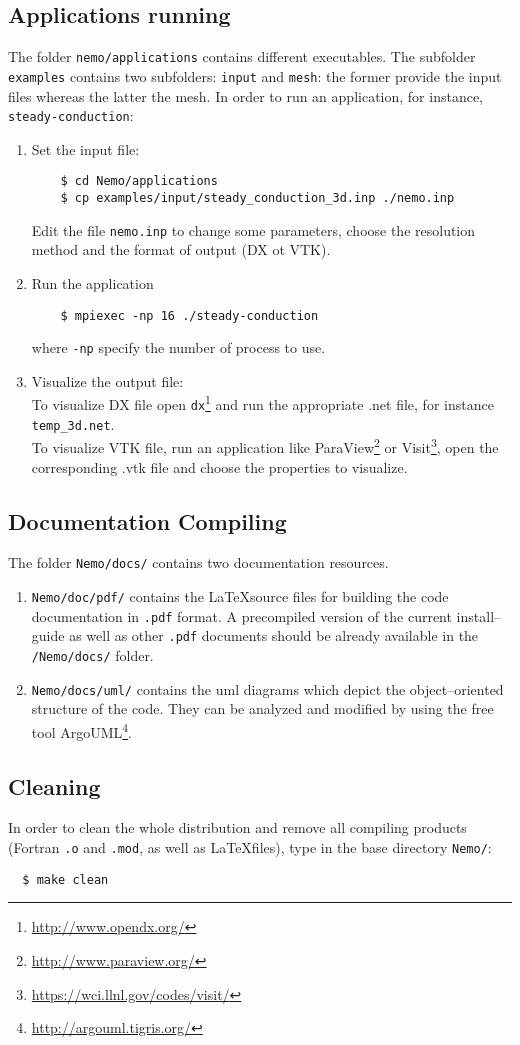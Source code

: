 \documentclass[a4paper,12pt]{article}%
\begin{document}
\subsection{Applications running}
The folder \verb+nemo/applications+ contains different executables. 
The subfolder \verb+examples+ contains two subfolders: \verb+input+ and 
\verb+mesh+: the former provide the input files whereas the latter the mesh.
In order to run an application, for instance, \verb+steady-conduction+:
\begin{enumerate}
\item Set the input file:
\begin{Verbatim}
    $ cd Nemo/applications
    $ cp examples/input/steady_conduction_3d.inp ./nemo.inp
\end{Verbatim}
Edit the file \verb+nemo.inp+ to change some parameters, choose the resolution method and the format of output (DX ot VTK).
\item Run the application
\begin{Verbatim}
    $ mpiexec -np 16 ./steady-conduction
\end{Verbatim}
where \verb+-np+ specify the number of process to use.
\item Visualize the output file:\\
To visualize DX file open \verb+dx+\footnote{\url{http://www.opendx.org/}} and run the appropriate .net file, for instance \verb+temp_3d.net+. \\
To visualize VTK file, run an application like ParaView\footnote{\url{http://www.paraview.org/}} or Visit\footnote{\url{https://wci.llnl.gov/codes/visit/}}, open the corresponding .vtk  file and choose the properties to visualize.
\end{enumerate}

\subsection{Documentation Compiling}

The folder \verb+Nemo/docs/+ contains two documentation resources.
\begin{enumerate}
\item \verb+Nemo/doc/pdf/+ contains the \LaTeX source files for
  building the code documentation in \verb+.pdf+ format. A precompiled
  version of the current install--guide as well as other \verb+.pdf+
  documents should be already available in the \verb+/Nemo/docs/+
  folder.
\item \verb+Nemo/docs/uml/+ contains the uml diagrams which depict the
  object--oriented structure of the code. They can be analyzed and
  modified by using the free tool
  ArgoUML\footnote{\url{http://argouml.tigris.org/}}.
\end{enumerate}


\subsection{Cleaning}
In order to clean the whole distribution and remove all compiling
products (Fortran \verb+.o+ and \verb+.mod+, as well as \LaTeX files),
type in the base directory \verb+Nemo/+:
\begin{Verbatim}
  $ make clean
\end{Verbatim}
\end{document}
